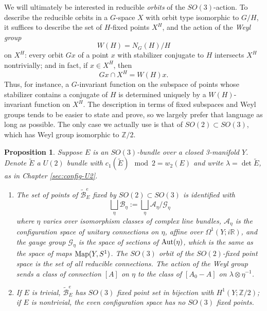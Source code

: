\documentclass[10pt,a4paper]{amsart}
\newtheorem{proposition}[theorem]{Proposition}
\theoremstyle{definition}
\theoremstyle{remark}
\numberwithin{figure}{qchap}
\begin{document}
We will ultimately be interested in reducible \textit{orbits} of the $SO(3)$-action. To describe the reducible orbits in a $G$-space $X$ with orbit type isomorphic to $G/H$, it suffices to describe the set of $H$-fixed points $X^H$, and the action of the \textit{Weyl group} 
$$W(H) = N_G(H)/H$$ 
on $X^H$: every orbit $Gx$ of a point $x$ with stabilizer conjugate to $H$ intersects $X^H$ nontrivially; and in fact, if $x \in X^H$, then 
$$Gx \cap X^H = W(H)x.$$ 
Thus, for instance, a $G$-invariant function on the subspace of points whose stabilizer contains a conjugate of $H$ is determined uniquely by a $W(H)$-invariant function on $X^H$. The description in terms of fixed subspaces and Weyl groups tends to be easier to state and prove, so we largely prefer that language as long as possible. The only case we actually use is that of $SO(2) \subset SO(3)$, which has Weyl group isomorphic to $\mathbb Z/2$.

\begin{proposition}\label{action1}Suppose $E$ is an $SO(3)$-bundle over a closed 3-manifold $Y$. Denote $\tilde E$ a $U(2)$ bundle with $c_1(\tilde E) \mod 2 = w_2(E)$ and write $\lambda = \det{\tilde{E}}$, as in Chapter \ref{sec:config-U2}.\begin{enumerate}
\item The set of points of $\widetilde{\mathcal B}^e_E$ fixed by $SO(2) \subset SO(3)$ is identified with $$\bigsqcup_\eta \mathcal B_\eta := \bigsqcup_\eta \mathcal A_\eta/\mathcal G_\eta$$ where $\eta$ varies over isomorphism classes of complex line bundles, $\mathcal A_\eta$ is the configuration space of unitary connections on $\eta$, affine over $\Omega^1(Y;i\mathbb R)$, and the gauge group $\mathcal G_\eta$ is the space of sections of $\textup{Aut}(\eta)$, which is the same as the space of maps $\textup{Map}(Y, S^1)$. The $SO(3)$ orbit of the $SO(2)$-fixed point space is the set of all reducible connections. The action of the Weyl group sends a class of connection $[A]$ on $\eta$ to the class of $[A_0 - A]$ on $\lambda \otimes \eta^{-1}$.
\item If $E$ is trivial, $\widetilde{\mathcal B}^e_E$ has $SO(3)$ fixed point set in bijection with $H^1(Y;\mathbb Z/2)$; if $E$ is nontrivial, the even configuration space has no $SO(3)$ fixed points.
\end{enumerate}
\end{proposition}
\end{document}
